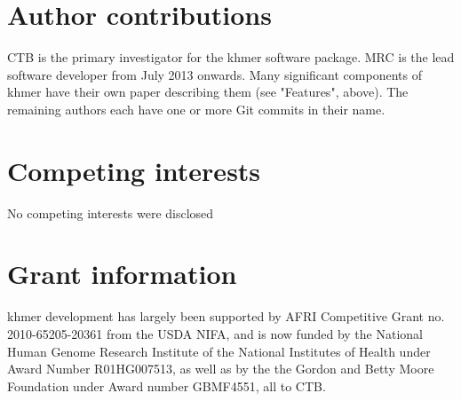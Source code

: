 \documentclass[10pt,a4paper,twocolumn]{article}
\begin{document}
\section*{Author contributions}
CTB is the primary investigator for the khmer software package. MRC is the lead software developer from July 2013 onwards. Many significant components of khmer have their own paper describing them (see "Features", above). The remaining authors each have one or more Git commits in their name.

\section*{Competing interests}
No competing interests were disclosed

\section*{Grant information}

khmer development has largely been supported by AFRI Competitive Grant
no. 2010-65205-20361 from the USDA NIFA, and is now funded by the
National Human Genome Research Institute of the National Institutes of
Health under Award Number R01HG007513, as well as by the the Gordon and Betty Moore Foundation under Award number GBMF4551, all to CTB.

\end{document}
